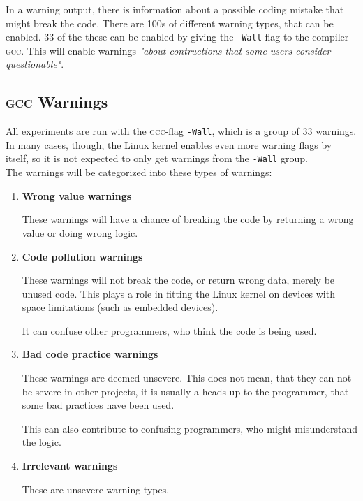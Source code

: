 \documentclass[a4paper,11pt]{report}
\newcommand{\textcode}[1]{\fboxsep=1pt\texttt{\colorbox{gray!20}{#1}}}
\begin{document}
In a warning output, there is information about a possible coding mistake that 
might break the code. There are 100s of different warning types, that can be 
enabled. 33 of the these can be enabled by giving the \textcode{-Wall} flag 
to the compiler \textsc{gcc}\cite{gccwarnings}. This will enable warnings 
\emph{"about contructions that some users consider questionable"}\cite{gccwarnings}.



            \subsection{\textsc{gcc} Warnings}
            \label{sec:gccwarns}
All experiments are run with the \textsc{gcc}-flag 
\textcode{-Wall}, which is a group of 33 warnings. In many cases, though, 
the Linux kernel enables even more warning flags by itself, so it is not expected to only 
get warnings from the \texttt{-Wall} group.
\\

The warnings will be categorized into these types of warnings:

\begin{enumerate}
    \item \textbf{Wrong value warnings}

These warnings will have a chance of breaking the code by returning a wrong
value or doing wrong logic.

    \item \textbf{Code pollution warnings}

These warnings will not break the code, or return wrong data, merely be 
unused code. This plays a role in fitting the Linux kernel on devices with 
space limitations (such as embedded devices).

It can confuse other programmers, who think the code is being used.

    \item \textbf{Bad code practice warnings}

These warnings are deemed unsevere. This does not mean, that they can not be 
severe in other projects, it is usually a heads up to the programmer, that some 
bad practices have been used.

This can also contribute to confusing programmers, who might misunderstand the 
logic.


    \item \textbf{Irrelevant warnings}

These are unsevere warning types.

\end{enumerate}
\end{document}
